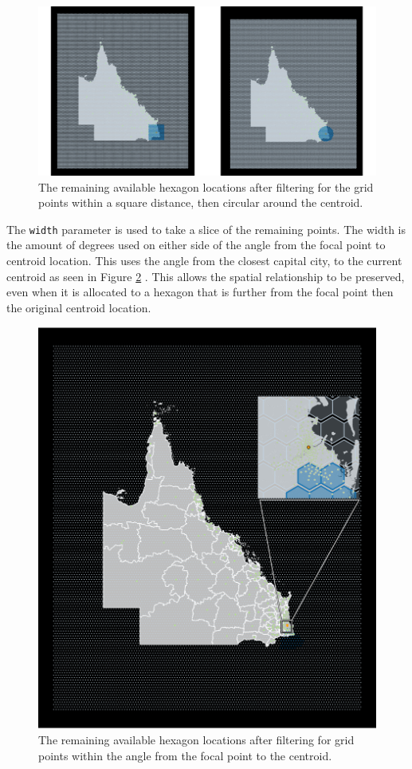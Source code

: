 \documentclass{monashthesis}
\begin{document}
\begin{figure}[H]
\centering
\includegraphics[width=16cm]{figures/03-algorithm/4grid.pdf}
\caption{\label{fig:buffers}The remaining available hexagon locations after filtering for the grid points within a square distance, then circular around the centroid.}
\end{figure}

The \texttt{width} parameter is used to take a slice of the remaining points. The width is the amount of degrees used on either side of the angle from the focal point to centroid location. This uses the angle from the closest capital city, to the current centroid as seen in Figure \ref{fig:angles} . This allows the spatial relationship to be preserved, even when it is allocated to a hexagon that is further from the focal point then the original centroid location.

\begin{figure}[H]
\centering
\includegraphics[width=16cm]{figures/03-algorithm/5allocate.pdf}
\caption{\label{fig:angles}The remaining available hexagon locations after filtering for grid points within the angle from the focal point to the centroid.}
\end{figure}
\end{document}
